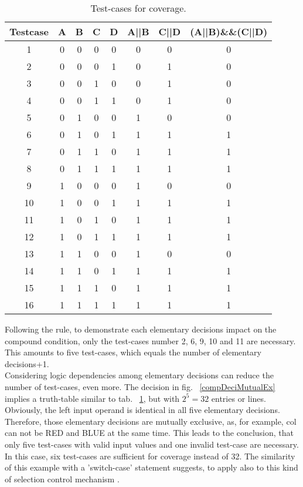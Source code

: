 	\begin{table}[h!]
		\begin{center}
			\begin{tabular}{c|c|c|c|c|c|c|c}
			Testcase & A 	& B		& C		& D		& A||B	& C||D	& (A||B)\&\&(C||D)	\\ \hline
			1		 & 0 & 0	& 0	& 0	& 0	& 0	& 0	\\ \hline
			2		 & 0	& 0	& 0	& 1 	& 0	& 1	& 0	\\ \hline
			3		 & 0	& 0	& 1	& 0	& 0	& 1	& 0	\\ \hline
			4		 & 0	& 0	& 1	& 1 	& 0	& 1	& 0	\\ \hline
			5		 & 0	& 1	& 0	& 0	& 1	& 0	& 0	\\ \hline
			6		 & 0	& 1	& 0	& 1 	& 1	& 1	& 1	\\ \hline
			7		 & 0	& 1	& 1	& 0	& 1	& 1	& 1	\\ \hline
			8		 & 0	& 1	& 1	& 1 	& 1	& 1	& 1	\\ \hline
			9		 & 1	& 0	& 0	& 0	& 1	& 0	& 0	\\ \hline
			10		 & 1	& 0	& 0	& 1 	& 1	& 1	& 1	\\ \hline
			11		 & 1	& 0	& 1	& 0	& 1	& 1	& 1	\\ \hline
			12		 & 1	& 0	& 1	& 1 	& 1	& 1	& 1	\\ \hline
			13		 & 1	& 1	& 0	& 0	& 1	& 0	& 0	\\ \hline
			14		 & 1	& 1	& 0	& 1 	& 1	& 1	& 1	\\ \hline
			15		 & 1	& 1	& 1	& 0	& 1	& 1	& 1	\\ \hline
			16		 & 1	& 1	& 1	& 1 	& 1	& 1	& 1	\\ \hline
			\end{tabular}
			\caption{Test-cases for \mcdc coverage.}
			\label{MCDCtable}
		\end{center}
	\end{table}
	Following the rule, to demonstrate each elementary decisions impact on the compound condition, only the test-cases number 2, 6, 9, 10 and 11 are necessary. This amounts to five test-cases, which equals the number of elementary decisions+1. \\
	Considering logic dependencies among elementary decisions can reduce the number of test-cases, even more. The decision in fig. ~\ref{compDeciMutualEx} implies a truth-table similar to tab. ~\ref{MCDCtable}, but with $2^{5} = 32$ entries or lines. Obviously, the left input operand is identical in all five elementary decisions. Therefore, those elementary decisions are mutually exclusive, as, for example, col can not be RED and BLUE at the same time. This leads to the conclusion, that only five test-cases with valid input values and one invalid test-case are necessary. In this case, six test-cases are sufficient for \mcdc coverage instead of 32. The similarity of this example with a 'switch-case' statement suggests, to apply \mcdc also to this kind of selection control mechanism \cite{Chilenski2001}. \\
